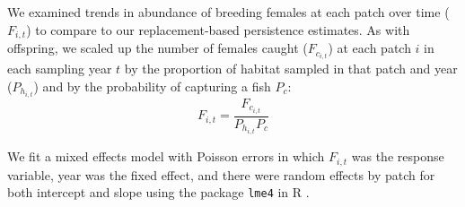 \documentclass[12pt, oneside]{article}   	%
\begin{document}
We examined trends in abundance of breeding females at each patch over time ($F_{i,t}$) to compare to our replacement-based persistence estimates. As with offspring, we scaled up the number of females caught ($F_{c_{i,t}}$) at each patch $i$ in each sampling year $t$ by the proportion of habitat sampled in that patch and year ($P_{h_{i,t}}$) and by the probability of capturing a fish $P_c$:
\begin{equation}
F_{i,t} = \frac{F_{c_{i,t}}}{P_{h_{i,t}}P_c}
\end{equation}

We fit a mixed effects model with Poisson errors in which $F_{i,t}$ was the response variable, year was the fixed effect, and there were random effects by patch for both intercept and slope using the package \texttt{lme4} in R \citep{lme42015package}.



\end{document}
